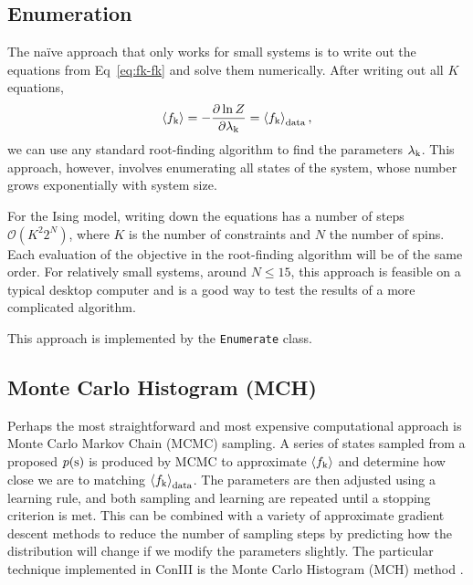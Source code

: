 \documentclass{jors}
\begin{document}
\subsection*{Enumeration}
The na\"{i}ve approach that only works for small systems is to write out the equations from Eq~\ref{eq:fk-fk} and solve them numerically. After writing out all $K$ equations,
\begin{equation}
	\left<f_{\rm k}\right> = -\frac{\partial \ln Z}{\partial \lambda_{\rm k}} = \left<f_{\rm k}\right>_{\rm data} \\,
\end{equation}
we can use any standard root-finding algorithm to find the parameters $\lambda_{\rm k}$.
This approach, however, involves enumerating all states of the system, whose number grows exponentially with system size.

For the Ising model, writing down the equations has a number of steps $\mathcal{O}(K^2 2^{N})$, where $K$ is the number of constraints and $N$ the number of spins.  Each evaluation of the objective in the root-finding algorithm will be of the same order. For relatively small systems, around $N\leq15$, this approach is feasible on a typical desktop computer and is a good way to test the results of a more complicated algorithm.

This approach is implemented by the {\tt Enumerate} class.


\subsection*{Monte Carlo Histogram (MCH)}
Perhaps the most straightforward and most expensive computational approach is Monte Carlo Markov Chain (MCMC) sampling.  A series of states sampled from a proposed $p({\rm s})$ is produced by MCMC to approximate $\left<f_{\rm k}\right>$ and determine how close we are to matching $\left<f_{\rm k}\right>_{\rm data}$.  The parameters are then adjusted using a learning rule, and both sampling and learning are repeated until a stopping criterion is met.
This can be combined with a variety of approximate gradient descent methods to reduce the number of sampling steps by predicting how the distribution will change if we modify the parameters slightly.
The particular technique implemented in ConIII is the Monte Carlo Histogram (MCH) method \cite{Broderick:2007wq}.
\end{document}
